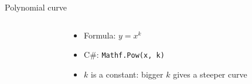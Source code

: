 \begin{frame}[fragile]{Polynomial curve}
    \begin{columns}
        \begin{column}{0.57\textwidth}
            \begin{center}
            \end{center}
        \end{column}
        \begin{column}{0.4\textwidth}
            \begin{itemize}
                \pause\item Formula: $y = x^k$
                \pause\item C\#: \lstinline{Mathf.Pow(x, k)}
                \pause\item $k$ is a constant: bigger $k$ gives a steeper curve
            \end{itemize}
        \end{column}
    \end{columns}
\end{frame}

